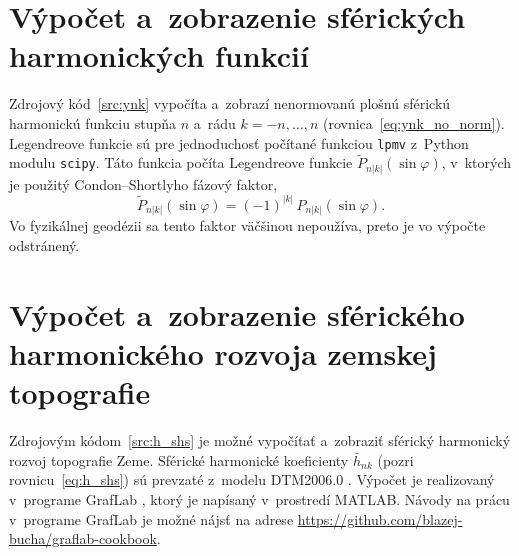 \documentclass[a4paper,12pt]{book}
\begin{document}






\chapter{Výpočet a~zobrazenie sférických harmonických funkcií}
\label{app:sh}

Zdrojový kód~\ref{src:ynk} vypočíta a~zobrazí nenormovanú plošnú sférickú
harmonickú funkciu stupňa $n$ a~rádu $k = -n, \dots, n$
(rovnica~\ref{eq:ynk_no_norm}).  Legendreove funkcie sú pre jednoduchosť
počítané funkciou \texttt{lpmv} z~Python modulu \texttt{scipy}.  Táto funkcia
počíta Legendreove funkcie $\tilde{P}_{n|k|}(\sin\varphi)$, v~ktorých je
použitý Condon--Shortlyho fázový faktor,
%
\begin{equation}
\tilde{P}_{n|k|}(\sin\varphi) = (-1)^{|k|} \, P_{n|k|}(\sin\varphi){.}
\end{equation}
%
Vo fyzikálnej geodézii sa tento faktor väčšinou nepoužíva, preto je vo výpočte
odstránený.








\chapter{Výpočet a~zobrazenie sférického harmonického rozvoja zemskej
topografie}
\label{app:shs_topography}

Zdrojovým kódom~\ref{src:h_shs} je možné vypočítať a~zobraziť sférický 
harmonický rozvoj topografie Zeme.  Sférické harmonické koeficienty 
$\bar{h}_{nk}$ (pozri rovnicu~\ref{eq:h_shs}) sú prevzaté z~modelu DTM2006.0 
\parencite{DTM2006}.  Výpočet je realizovaný v~programe GrafLab 
\parencite{GrafLab}, ktorý je napísaný v~prostredí MATLAB.  Návody na prácu 
v~programe GrafLab je možné nájsť na adrese 
\url{https://github.com/blazej-bucha/graflab-cookbook}.









\printbibliography[title=Literat\'{u}ra]

\end{document}
